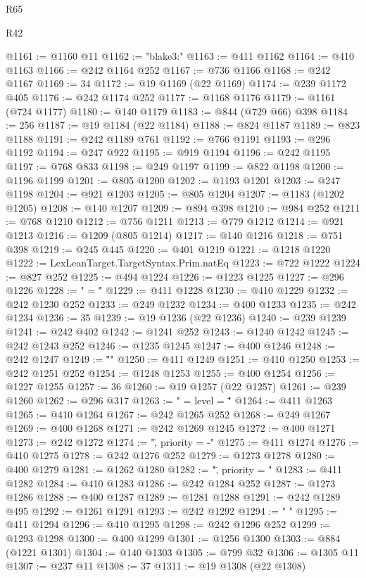 \begin{lexlean}{R65}
\begin{lexlean}{R42}
\begin{coremodule}
{{{{{{{{{{{{{{{{{{{{{{{{{{{{{{{{{{{{{{{{{{{{{{{{{{{{{{{{{{{{{{{{{{{{{{{{{{{{{{{{{{{{{{{{{{{{{{{{{{{{{{{{{{{{{{{{{{{{{{{{{{{{{{{{{{{{{{{{{{{{{{{{{{{{{{{{{{{{{{{{{{{{{{{{{{{{{{{{{{{{{{{@1161 := @1160 @11
@1162 := "blake3:"
@1163 := @411 @1162
@1164 := @410 @1163
@1166 := @242 @1164 @252
@1167 := @736 @1166
@1168 := @242 @1167
@1169 := 34
@1172 := @19 @1169 (@22 @1169)
@1174 := @239 @1172 @405
@1176 := @242 @1174 @252
@1177 := @1168 @1176
@1179 := @1161 (@724 @1177)
@1180 := @140 @1179
@1183 := @844 (@729 @66) @398
@1184 := 256
@1187 := @19 @1184 (@22 @1184)
@1188 := @824 @1187
@1189 := @823 @1188
@1191 := @242 @1189 @761
@1192 := @766 @1191
@1193 := @296 @1192
@1194 := @247 @922
@1195 := @919 @1194
@1196 := @242 @1195
@1197 := @768 @833
@1198 := @249 @1197
@1199 := @822 @1198
@1200 := @1196 @1199
@1201 := @805 @1200
@1202 := @1193 @1201
@1203 := @247 @1198
@1204 := @921 @1203
@1205 := @805 @1204
@1207 := @1183 (@1202 @1205)
@1208 := @140 @1207
@1209 := @894 @398
@1210 := @984 @252
@1211 := @768 @1210
@1212 := @756 @1211
@1213 := @779 @1212
@1214 := @921 @1213
@1216 := @1209 (@805 @1214)
@1217 := @140 @1216
@1218 := @751 @398
@1219 := @245 @445
@1220 := @401 @1219
@1221 := @1218 @1220
@1222 := LexLeanTarget.TargetSyntax.Prim.natEq
@1223 := @722 @1222
@1224 := @827 @252
@1225 := @494 @1224
@1226 := @1223 @1225
@1227 := @296 @1226
@1228 := " = \""
@1229 := @411 @1228
@1230 := @410 @1229
@1232 := @242 @1230 @252
@1233 := @249 @1232
@1234 := @400 @1233
@1235 := @242 @1234
@1236 := 35
@1239 := @19 @1236 (@22 @1236)
@1240 := @239 @1239
@1241 := @242 @402
@1242 := @1241 @252
@1243 := @1240 @1242
@1245 := @242 @1243 @252
@1246 := @1235 @1245
@1247 := @400 @1246
@1248 := @242 @1247
@1249 := "\"\n"
@1250 := @411 @1249
@1251 := @410 @1250
@1253 := @242 @1251 @252
@1254 := @1248 @1253
@1255 := @400 @1254
@1256 := @1227 @1255
@1257 := 36
@1260 := @19 @1257 (@22 @1257)
@1261 := @239 @1260
@1262 := @296 @317
@1263 := " = { level = \""
@1264 := @411 @1263
@1265 := @410 @1264
@1267 := @242 @1265 @252
@1268 := @249 @1267
@1269 := @400 @1268
@1271 := @242 @1269 @1245
@1272 := @400 @1271
@1273 := @242 @1272
@1274 := "\", priority = -"
@1275 := @411 @1274
@1276 := @410 @1275
@1278 := @242 @1276 @252
@1279 := @1273 @1278
@1280 := @400 @1279
@1281 := @1262 @1280
@1282 := "\", priority = "
@1283 := @411 @1282
@1284 := @410 @1283
@1286 := @242 @1284 @252
@1287 := @1273 @1286
@1288 := @400 @1287
@1289 := @1281 @1288
@1291 := @242 @1289 @495
@1292 := @1261 @1291
@1293 := @242 @1292
@1294 := " }\n"
@1295 := @411 @1294
@1296 := @410 @1295
@1298 := @242 @1296 @252
@1299 := @1293 @1298
@1300 := @400 @1299
@1301 := @1256 @1300
@1303 := @884 (@1221 @1301)
@1304 := @140 @1303
@1305 := @799 @32
@1306 := @1305 @11
@1307 := @237 @11
@1308 := 37
@1311 := @19 @1308 (@22 @1308)
}}}}}}}}}}}}}}}}}}}}}}}}}}}}}}}}}}}}}}}}}}}}}}}}}}}}}}}}}}}}}}}}}}}}}}}}}}}}}}}}}}}}}}}}}}}}}}}}}}}}}}}}}}}}}}}}}}}}}}}}}}}}}}}}}}}}}}}}}}}}}}}}}}}}}}}}}}}}}}}}}}}}}}}}}}}}}}}}}}}}}}}
\end{coremodule}
\end{lexlean}
\end{lexlean}
